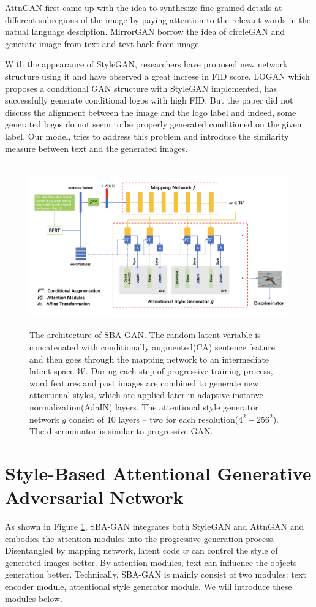 \documentclass{article}
\begin{document}
AttnGAN \cite{attngan} first came up with the idea to synthesize fine-grained details at different subregions of the image by paying attention to the relevant words in the natual language desciption. MirrorGAN\cite{mirrorgan} borrow the idea of circleGAN\cite{cyclegan} and generate image from text and text back from image.

With the appearance of StyleGAN\cite{stylegan}, researchers have proposed new network structure using it and have observed a great increse in FID score\cite{fid}. LOGAN \cite{logan} which proposes a conditional GAN structure with StyleGAN implemented, has successfully generate conditional logos with high FID. But the paper did not discuss the alignment between the image and the logo label and indeed, some generated logos do not seem to be properly generated conditioned on the given label. Our model, tries to address this problem and introduce the similarity measure between text and the generated images.


\begin{figure}[htbp]

\centering
\includegraphics[width=450pt, height=200pt]{milestone/network.png} 
\caption{The architecture of SBA-GAN. The random latent variable is concatenated with conditionally augmented(CA) sentence feature and then goes through the mapping network to an intermediate latent space $\mathcal{W}$. During each step of progressive training process, word features and past images are combined to generate new attentional styles, which are applied later in adaptive instanve normalization(AdaIN) layers. The attentional style generator network $g$ consist of 10 layers -- two for each resolution($4^2 - 256^2$). The discriminator is similar to progressive GAN\cite{progan}.}
\label{model}
\end{figure}

\section{Style-Based Attentional Generative Adversarial Network}
As shown in Figure \ref{model}, SBA-GAN integrates both StyleGAN\cite{stylegan} and AttnGAN\cite{attngan} and embodies the attention modules into the progressive generation process. Disentangled by mapping network, latent code $w$ can control the style of generated images better. By attention modules, text can influence the objects generation better. Technically, SBA-GAN is mainly consist of two modules: text encoder module, attentional style generator module. We will introduce these modules below.
\end{document}
